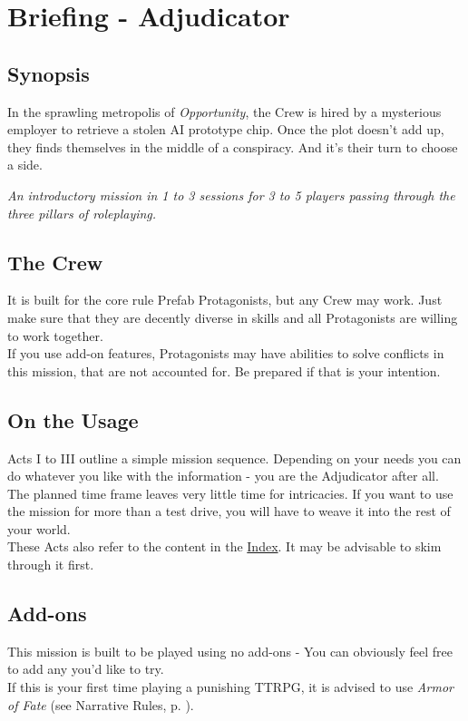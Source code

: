 \chapter{Briefing - Adjudicator}
\section{Synopsis}
In the sprawling metropolis of \emph{Opportunity},
	the Crew is hired by a mysterious employer to retrieve a stolen AI prototype chip.
Once the plot doesn't add up,
	they finds themselves in the middle of a conspiracy.
And it's their turn to choose a side.
\par
{
	\itshape
	An introductory mission
	in 1 to 3 sessions
	for 3 to 5 players
	passing through the three pillars of roleplaying.
}
\section{The Crew}
It is built for the core rule Prefab Protagonists,
but any Crew may work.
Just make sure that they are decently diverse in skills
and all Protagonists are willing to work together.
\\%
If you use add-on features,
	Protagonists may have abilities to solve conflicts in this mission,
	that are not accounted for.
Be prepared if that is your intention.
\section{On the Usage}
Acts I to III outline a simple mission sequence.
Depending on your needs you can do whatever you like with the information
	- you are the Adjudicator after all.
\\%
The planned time frame leaves very little time for intricacies.
If you want to use the mission for more than a test drive,
	you will have to weave it into the rest of your world.
\\%
These Acts also refer to the content in the \hyperref[ch:index]{Index}.
It may be advisable to skim through it first.
\section{Add-ons}
This mission is built to be played using no add-ons
- You can obviously feel free to add any you'd like to try.
\\%
If this is your first time playing a punishing TTRPG,
it is advised to use \emph{Armor of Fate} (see Narrative Rules, p. \pageref{narrative-ch:armoroffate}).

